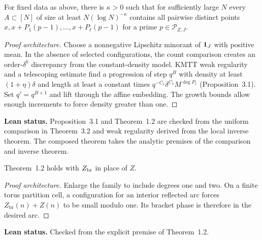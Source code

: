 \begin{theorem}[1.2, recurrence]\label{t:recurrence}
\leanok
{}
For fixed data as above, there is $\kappa>0$
such that for sufficiently large $N$ every $A\subset[N]$ of size at
least $N(\log N)^{-\kappa}$ contains all pairwise distinct points
$x,x+P_1(p-1),\ldots,x+P_\ell(p-1)$ for a prime
$p\in\mathcal P_{Z,J}$.
\end{theorem}
\begin{proof}[Proof architecture]
\leanok
Choose a nonnegative Lipschitz minorant of $\mathbf 1_J$ with positive mean.
In the absence of selected configurations, the count comparison
creates an order-$\delta^k$ discrepancy from the constant-density model.
KMTT weak regularity and a telescoping estimate find a progression of
step $q^B$ with density at least $(1+\eta)\delta$ and length at least
a constant times $q^{-C_1}\delta^{C_1}M^{\deg P_1}$ (Proposition~3.1).
Set $q'=q^{B+1}$ and lift through the affine embedding. The growth
bounds allow enough increments to force density greater than one.
\end{proof}
\noindent\textbf{Lean status.} Proposition~3.1 and Theorem~1.2 are
checked from the uniform comparison in Theorem~3.2 and weak regularity
derived from the local inverse theorem. The composed theorem takes the
analytic premises of the comparison and inverse theorem.

\begin{corollary}\label{c:bracket-recurrence}
\leanok
Theorem~1.2 holds with $Z_{\rm br}$ in place of $Z$.
\end{corollary}
\begin{proof}[Proof architecture]
\leanok
Enlarge the family to include degrees one and two.
On a finite torus partition cell, a configuration for an interior
reflected arc forces $Z_{\mathrm{br}}(n)+Z(n)$ to be small modulo one.
Its bracket phase is therefore in the desired arc.
\end{proof}
\noindent\textbf{Lean status.} Checked from the explicit
premise of Theorem~1.2.

